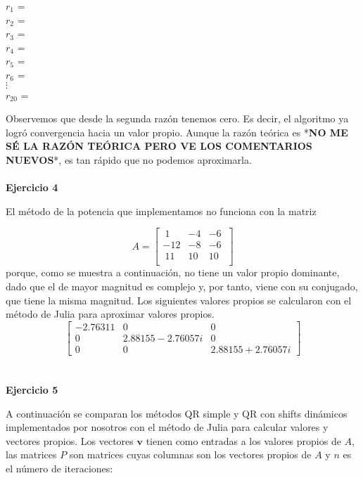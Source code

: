 \documentclass[11pt]{article}
\begin{document}
\begin{multicols}{3}
\noindent
$ r_{1} $ =  \\
$ r_{2} $ =  \\
$ r_{3} $ =  \\
$ r_{4} $ =  \\
$ r_{5} $ =  \\
$ r_{6} $ =  \\
$ \vdots $ \\
$ r_{20} $ =  \\
\end{multicols}

Observemos que desde la segunda razón tenemos cero. Es decir, el algoritmo
ya logró convergencia hacia un valor propio. Aunque la razón teórica es
*\textbf{NO ME SÉ LA RAZÓN TEÓRICA PERO VE LOS COMENTARIOS NUEVOS}*, es tan
rápido que no podemos aproximarla.
\\
\\

\noindent
\textbf{Ejercicio 4}

\noindent
El método de la potencia que implementamos no funciona con la matriz

$$
A =
\begin{bmatrix}
 \ 1 & -4 & -6 \ \\
-12 & -8 & -6 \ \\
 \ 11 & 10 & 10 \ \\
\end{bmatrix}
$$
porque, como se muestra a continuación, no tiene un valor propio dominante, dado que el de mayor magnitud es complejo y, por tanto, viene con su conjugado, que tiene la misma magnitud. Los siguientes valores propios se calcularon con el método de Julia para aproximar valores propios.
$$
\begin{bmatrix}
 -2.76311 & 0 & 0 \\
 0 & 2.88155-2.76057i & 0 \\
 0 & 0 & 2.88155+2.76057i
\end{bmatrix}
$$
\\
\\

\noindent
\textbf{Ejercicio 5}


\noindent
A continuación se comparan los métodos QR simple y QR con shifts dinámicos implementados por nosotros con el método de Julia para calcular valores y vectores propios. Los vectores $\textbf{v}$ tienen como entradas a los valores propios de $A$, las matrices $P$ son matrices cuyas columnas son los vectores propios de $A$ y $n$ es el número de iteraciones:
\\
\\
\end{document}
